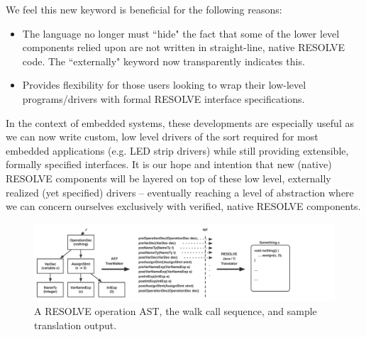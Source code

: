 
We feel this new keyword is beneficial for the following reasons:
\begin{itemize}
\item The language no longer must ``hide" the fact that some of the lower level components relied upon are not written in straight-line, native RESOLVE code. The ``externally" keyword now transparently indicates this.
\item Provides flexibility for those users looking to wrap their low-level programs/drivers with formal RESOLVE interface specifications.
\end{itemize}

In the context of embedded systems, these developments are especially useful as we can now write custom, low level  drivers of the sort required for most embedded applications (e.g. LED strip drivers) while still providing extensible, formally specified interfaces. It is our hope and intention that new (native) RESOLVE components will be layered on top of these low level, externally realized (yet specified) drivers -- eventually reaching a level of abstraction where we can concern ourselves exclusively with verified, native RESOLVE components.





\begin{figure}
\centering
\includegraphics[scale=.55]{figs/ast_traversal.pdf}
\caption{A RESOLVE operation AST, the walk call sequence, and sample translation output.}
\end{figure}
\label{fig:ast}